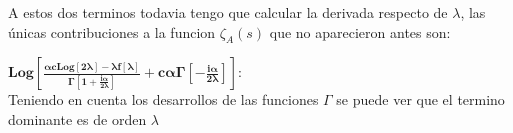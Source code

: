 A estos dos terminos todavia tengo que calcular la derivada respecto de $\lambda$, las únicas contribuciones a la funcion $\zeta _A (s)$ que no aparecieron antes son:


\begin{comment}
\textbf{Log[S2]:} \\

S2 es una serie de potencias que tiende a 1 en $\lambda \rightarrow \infty$, entonces tiene la forma:

\begin{equation}
S2 = 1 + \sum _{n=1} ^{\infty} \frac{a _n}{\lambda ^n}
\end{equation}

Debido a que $S2$ tiende a $0$, puedo resarrollar su derivada logaritmica y me cambia la primer potencia que aparece, siendo $\frac{1}{\lambda ^ 2}$:


\begin{equation}
\partial _{\lambda} Log[S2] = 
\frac{
    \sum _{n=1} ^{\infty} \frac{(-n) a_n}{\lambda ^{n+1}} }{1 + \sum _{n=1} ^{\infty} \frac{a _n}{\lambda ^n} }
= \sum _{n=2} ^{\infty} \frac{b _n}{\lambda ^n}
\end{equation}

De aquí se puede ver que este termino de la suma contribuira a polos simples, en los semienteros (como pasa en el problema regular), siendo la primer contribucion en $s=-1/2$ \\

$\mathbf{
- \frac{i \alpha}{2 \lambda} Log[2 \lambda L]} : 
$ \\

Este termino es el mismo que aparecía en el problema regular, y va a contribuir a un polo doble en $s=-1/2$  \\



En La rama de abajo voy a tener dos terminos que se comportan diferente que los anteriores:

$\mathbf{
		Log[\Gamma [ 1 - \frac{i \alpha}{2 \lambda} ] ]
		}: 
		$ \\

\end{comment}

$\mathbf{
Log[
	\frac{\alpha c Log[2 \lambda] - \lambda f[\lambda] }{\Gamma \left[1 + \frac{i \alpha}{ 2 \lambda} \right] } + 
	c \alpha \Gamma \left[ - \frac{i \alpha}{2 \lambda} \right] ] :
}$ \\

Teniendo en cuenta los desarrollos de las funciones $\Gamma$ se puede ver que el termino dominante es de orden $\lambda$


